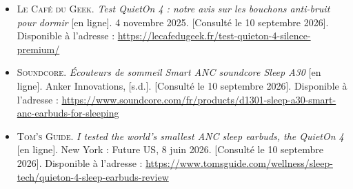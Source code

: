 \begin{itemize}
  \item \textsc{Le Café du Geek}. \textit{Test QuietOn 4 : notre avis sur les
        bouchons anti-bruit pour dormir} [en ligne]. 4 novembre 2025.
        [Consulté le 10 septembre 2026]. Disponible à l'adresse :
        \url{https://lecafedugeek.fr/test-quieton-4-silence-premium/}

  \item \textsc{Soundcore}. \textit{Écouteurs de sommeil Smart ANC soundcore
        Sleep A30} [en ligne]. Anker Innovations, [s.d.].
        [Consulté le 10 septembre 2026]. Disponible à l'adresse :
        \url{https://www.soundcore.com/fr/products/d1301-sleep-a30-smart-anc-earbuds-for-sleeping}

  \item \textsc{Tom's Guide}. \textit{I tested the world's smallest ANC sleep
        earbuds, the QuietOn 4} [en ligne]. New York : Future US, 8 juin 2026.
        [Consulté le 10 septembre 2026]. Disponible à l'adresse :
        \url{https://www.tomsguide.com/wellness/sleep-tech/quieton-4-sleep-earbuds-review}

\end{itemize}

%
%
